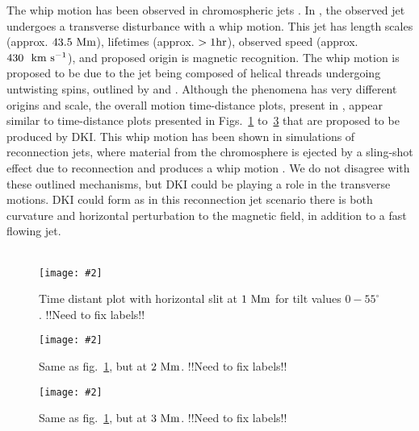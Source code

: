 \documentclass[12pt]{ociamthesis}
\newcommand{\mfig}[4]{
  \begin{figure}
  \begin{center}
  \texttt{[image: \#2]}
  \caption{#3}
  \label{#4}
  \end{center}
  \end{figure}}
\newcommand{\kms}{~\rm{km ~s^{-1}}}
\newcommand{\np}{\\ \\}
\begin{document}
The whip motion has been observed in chromospheric jets \citep{Liu2009ApJ707L37L}. In \cite{Liu2009ApJ707L37L}, the observed jet undergoes a transverse disturbance with a whip motion. This jet has length scales (approx. $43.5~\rm{Mm}$), lifetimes (approx. $>1\rm{hr}$), observed speed (approx. $430~\kms$), and proposed origin is magnetic recognition. The whip motion is proposed to be due to the jet being composed of helical threads undergoing untwisting spins, outlined by \cite{Shibata1985PASJ3731S, Shibata1986SoPh103299S} and \cite{Canfield1996ApJ4641016C}. Although the phenomena has very different origins and scale, the overall motion time-distance plots, present in \cite{Liu2009ApJ707L37L}, appear similar to time-distance plots presented in Figs.~\ref{td_plot_1Mm} to~\ref{td_plot_3Mm} that are proposed to be produced by DKI. This whip motion has been shown in simulations of reconnection jets, where material from the chromosphere is ejected by a sling-shot effect due to reconnection and produces a whip motion \citep{Yokoyama1996PASJ48353Y, Kotani2020PASJ7275K}. We do not disagree with these outlined mechanisms, but DKI could be playing a role in the transverse motions. DKI could form as in this reconnection jet scenario there is both curvature and horizontal perturbation to the magnetic field, in addition to a fast flowing jet. \np
\mfig{1}{figures/td_plot_1Mm.png}{Time distant plot with horizontal slit at $1~\rm{Mm}$ for tilt values $0-55^{\circ}$.{\color{green} !!Need to fix labels!!}}{td_plot_1Mm}
%
\mfig{1}{figures/td_plot_2Mm.png}{Same as fig.~\ref{td_plot_1Mm}, but at $2~\rm{Mm}$. {\color{green} !!Need to fix labels!!}}{td_plot_2Mm}
\mfig{1}{figures/td_plot_3Mm.png}{Same as fig.~\ref{td_plot_1Mm}, but at $3~\rm{Mm}$. {\color{green} !!Need to fix labels!!}}{td_plot_3Mm}
\end{document}
